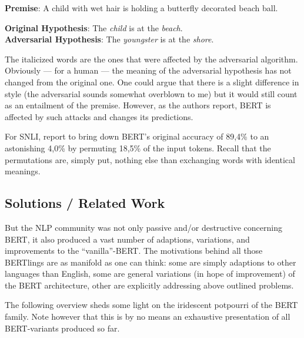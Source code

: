 \begin{examples}
  \item \textbf{Premise}: A child with wet hair is holding a butterfly decorated beach ball.

        \textbf{Original Hypothesis}: The \emph{child} is at the \emph{beach}.\\
        \textbf{Adversarial Hypothesis}: The \emph{youngster} is at the \emph{shore}.
\end{examples}

The italicized words are the ones that were affected by the adversarial algorithm.
Obviously --- for a human --- the meaning of the adversarial hypothesis has not
changed from the original one. One could argue that there is a slight difference
in style (the adversarial sounds somewhat overblown to me) but it would still count
as an entailment of the premise. However, as the authors report, BERT is affected
by such attacks and changes its predictions.

For SNLI, \citeauthor{jin2020bert} report to bring down BERT's original accuracy of
89,4\% to an astonishing 4,0\% by permuting 18,5\% of the input tokens. Recall that
the permutations are, simply put, nothing else than exchanging words with identical meanings.




\subsection{Solutions / Related Work}

But the NLP community was not only passive and/or destructive concerning BERT, it also
produced a vast number of adaptions, variations, and improvements to the ``vanilla''-BERT.
The motivations behind all those BERTlings are as manifold as one can think: some are simply
adaptions to other languages than English, some are general variations (in hope of improvement)
of the BERT architecture, other are explicitly addressing above outlined problems.

The following overview sheds some light on the iridescent potpourri of the BERT
family.
Note however that this is by no means an exhaustive presentation of all BERT-variants produced so far.


